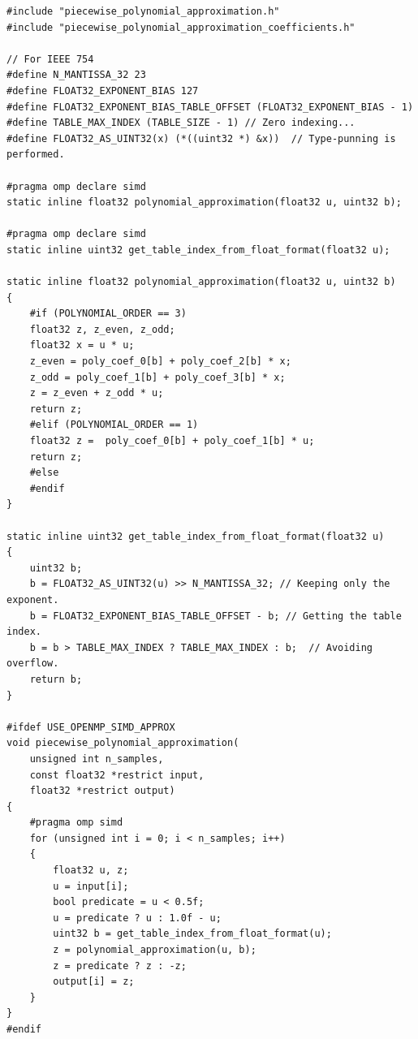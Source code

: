 \documentclass[11pt,a4paper,twoside,english]{extarticle}
\begin{document}
\begin{lstfloat}[H]
\begin{lstlisting}[style=C, captionpos=b, caption={Piecewise polynomial approximation implementations using OpenMP.}, label={code:c:piecewise_polynomial_approximation_use_openmp_simd_approx}]
#include "piecewise_polynomial_approximation.h"
#include "piecewise_polynomial_approximation_coefficients.h"

// For IEEE 754
#define N_MANTISSA_32 23
#define FLOAT32_EXPONENT_BIAS 127
#define FLOAT32_EXPONENT_BIAS_TABLE_OFFSET (FLOAT32_EXPONENT_BIAS - 1)
#define TABLE_MAX_INDEX (TABLE_SIZE - 1) // Zero indexing...
#define FLOAT32_AS_UINT32(x) (*((uint32 *) &x))  // Type-punning is performed.

#pragma omp declare simd
static inline float32 polynomial_approximation(float32 u, uint32 b);

#pragma omp declare simd
static inline uint32 get_table_index_from_float_format(float32 u);

static inline float32 polynomial_approximation(float32 u, uint32 b) 
{
    #if (POLYNOMIAL_ORDER == 3)
    float32 z, z_even, z_odd;
    float32 x = u * u;
    z_even = poly_coef_0[b] + poly_coef_2[b] * x;
    z_odd = poly_coef_1[b] + poly_coef_3[b] * x;
    z = z_even + z_odd * u;
    return z;
    #elif (POLYNOMIAL_ORDER == 1)
    float32 z =  poly_coef_0[b] + poly_coef_1[b] * u;
    return z;
    #else
    #endif
}

static inline uint32 get_table_index_from_float_format(float32 u)
{
    uint32 b;
    b = FLOAT32_AS_UINT32(u) >> N_MANTISSA_32; // Keeping only the exponent.
    b = FLOAT32_EXPONENT_BIAS_TABLE_OFFSET - b; // Getting the table index.
    b = b > TABLE_MAX_INDEX ? TABLE_MAX_INDEX : b;  // Avoiding overflow.
    return b;
}

#ifdef USE_OPENMP_SIMD_APPROX
void piecewise_polynomial_approximation(
    unsigned int n_samples,
    const float32 *restrict input, 
    float32 *restrict output)
{
    #pragma omp simd 
    for (unsigned int i = 0; i < n_samples; i++)
    {
        float32 u, z;
        u = input[i];
        bool predicate = u < 0.5f;
        u = predicate ? u : 1.0f - u;
        uint32 b = get_table_index_from_float_format(u);
        z = polynomial_approximation(u, b);
        z = predicate ? z : -z;
        output[i] = z;
    }
}
#endif
\end{lstlisting}
\end{lstfloat}
\end{document}
